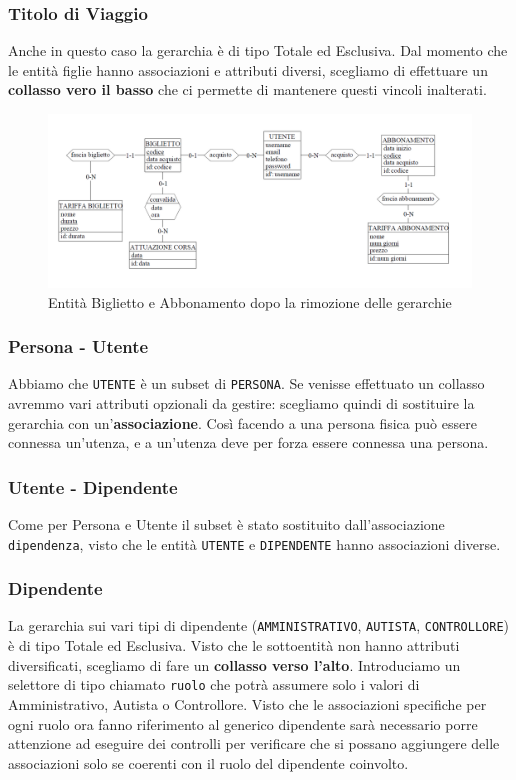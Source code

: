 \documentclass[12pt,a4paper]{report}
\begin{document}
\subsubsection{Titolo di Viaggio}
Anche in questo caso la gerarchia è di tipo Totale ed Esclusiva.
Dal momento che le entità figlie hanno associazioni e attributi diversi, scegliamo di effettuare un \textbf{collasso vero il basso} che ci permette di mantenere questi vincoli inalterati.

\begin{figure}[H]
	\centering
	\includegraphics[width=1\textwidth]{GerarchiaTitoloViaggio}
 	\caption{Entità Biglietto e Abbonamento dopo la rimozione delle gerarchie}
\end{figure}

\subsubsection{Persona - Utente}
Abbiamo che \texttt{UTENTE} è un subset di \texttt{PERSONA}.
Se venisse effettuato un collasso avremmo vari attributi opzionali da gestire: scegliamo quindi di sostituire la gerarchia con un'\textbf{associazione}.
Così facendo a una persona fisica può essere connessa un'utenza, e a un'utenza deve per forza essere connessa una persona.

\subsubsection{Utente - Dipendente}
Come per Persona e Utente il subset è stato sostituito dall'associazione \texttt{dipendenza}, visto che le entità \texttt{UTENTE} e \texttt{DIPENDENTE} hanno associazioni diverse.

\subsubsection{Dipendente}
La gerarchia sui vari tipi di dipendente (\texttt{AMMINISTRATIVO}, \texttt{AUTISTA}, \texttt{CONTROLLORE}) è di tipo Totale ed Esclusiva.
Visto che le sottoentità non hanno attributi diversificati, scegliamo di fare un \textbf{collasso verso l'alto}.
Introduciamo un selettore di tipo chiamato \texttt{ruolo} che potrà assumere solo i valori di Amministrativo, Autista o Controllore.
Visto che le associazioni specifiche per ogni ruolo ora fanno riferimento al generico dipendente sarà necessario porre attenzione ad eseguire dei controlli per verificare che si possano aggiungere delle associazioni solo se coerenti con il ruolo del dipendente coinvolto.
\end{document}

